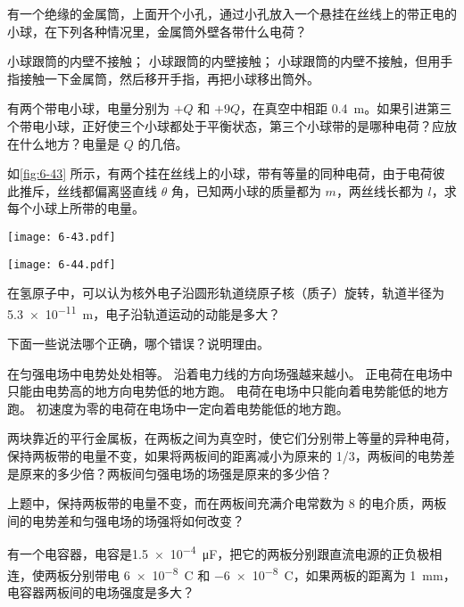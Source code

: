 \begin{Exercise}
\begin{question}
	\item 有一个绝缘的金属筒，上面开个小孔，通过小孔放入一个悬挂在丝线上的带正电的小球，在下列各种情况里，金属筒外壁各带什么电荷？
	\begin{tasks}
		\task 小球跟筒的内壁不接触；
		\task 小球跟筒的内壁接触；
		\task 小球跟筒的内壁不接触，但用手指接触一下金属筒，然后移开手指，再把小球移出筒外。
	\end{tasks}
	\item 有两个带电小球，电量分别为 $+Q$ 和 $+9Q$，在真空中相距 \qty{0.4}{m}。如果引进第三个带电小球，正好使三个小球都处于平衡状态，第三个小球带的是哪种电荷？应放在什么地方？电量是 $Q$ 的几倍。
	\item 如\cref{fig:6-43} 所示，有两个挂在丝线上的小球，带有等量的同种电荷，由于电荷彼此推斥，丝线都偏离竖直线 $\theta$ 角，已知两小球的质量都为 $m$，两丝线长都为 $l$，求每个小球上所带的电量。
	\begin{figurehere}
	\begin{minipage}[b]{0.48\linewidth}\centering
		\texttt{[image: 6-43.pdf]}
	\caption{}\label{fig:6-43}
	\end{minipage}
	\begin{minipage}[b]{0.48\linewidth}\centering
		\texttt{[image: 6-44.pdf]}
		\caption{}\label{fig:6-44}
	\end{minipage}
	\end{figurehere}
	\item 在氢原子中，可以认为核外电子沿圆形轨道绕原子核（质子）旋转，轨道半径为 \qty{5.3e-11}{m}，电子沿轨道运动的动能是多大？
	\item 下面一些说法哪个正确，哪个错误？说明理由。
	\begin{tasks}
		\task 在匀强电场中电势处处相等。
		\task 沿着电力线的方向场强越来越小。
		\task 正电荷在电场中只能由电势高的地方向电势低的地方跑。
		\task 电荷在电场中只能向着电势能低的地方跑。
		\task 初速度为零的电荷在电场中一定向着电势能低的地方跑。
	\end{tasks}
	\item 两块靠近的平行金属板，在两板之间为真空时，使它们分别带上等量的异种电荷，保持两板带的电量不变，如果将两板间的距离减小为原来的 1/3，两板间的电势差是原来的多少倍？两板间匀强电场的场强是原来的多少倍？
	\item 上题中，保持两板带的电量不变，而在两板间充满介电常数为 8 的电介质，两板间的电势差和匀强电场的场强将如何改变？
	\item 有一个电容器，电容是\qty{1.5e-4}{\micro F}，把它的两板分别跟直流电源的正负极相连，使两板分别带电 \qty{+6e-8}{C} 和 \qty{-6e-8}{C}，如果两板的距离为 \qty{1}{mm}，电容器两板间的电场强度是多大？

\end{question}
\end{Exercise}
